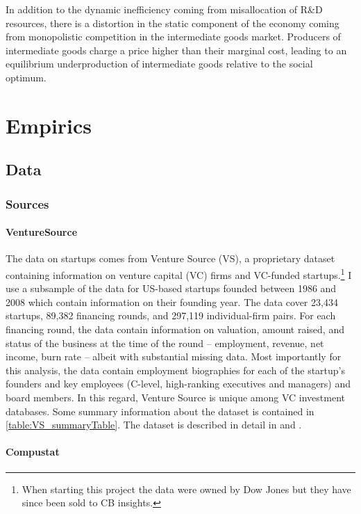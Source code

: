 \documentclass[11pt,english]{article}
\begin{document}
In addition to the dynamic inefficiency coming from misallocation of R\&D resources, there is a distortion in the static component of the economy coming from monopolistic competition in the intermediate goods market. Producers of intermediate goods charge a price higher than their marginal cost, leading to an equilibrium underproduction of intermediate goods relative to the social optimum.  

\section{Empirics}\label{sec:empirics}

\subsection{Data}

\subsubsection{Sources}

\paragraph{VentureSource}

The data on startups comes from Venture Source (VS), a proprietary dataset containing information on venture capital (VC) firms and VC-funded startups.\footnote{When starting this project the data were owned by Dow Jones but they have since been sold to CB insights.} I use a subsample of the data for US-based startups founded between 1986 and 2008 which contain information on their founding year. The data cover 23,434 startups, 89,382 financing rounds, and 297,119 individual-firm pairs. For each financing round, the data contain information on valuation, amount raised, and status of the business at the time of the round -- employment, revenue, net income, burn rate -- albeit with substantial missing data. Most importantly for this analysis, the data contain employment biographies for each of the startup's founders and key employees (C-level, high-ranking executives and managers) and board members. In this regard, Venture Source is unique among VC investment databases. Some summary information about the dataset is contained in \autoref{table:VS_summaryTable}. The dataset is described in detail in \cite{kaplan_how_2002} and \cite{kaplan_venture_2016}. 

\paragraph{Compustat}
\end{document}
